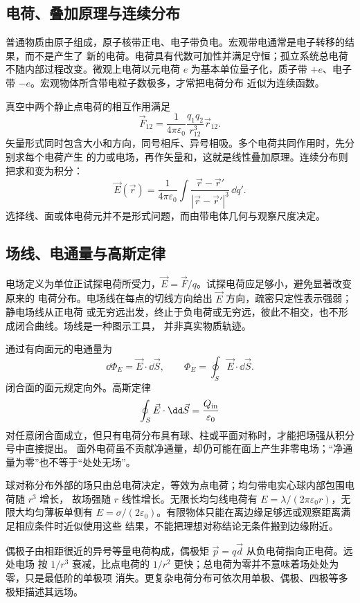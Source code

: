 \subsection*{电荷、叠加原理与连续分布}

普通物质由原子组成，原子核带正电、电子带负电。宏观带电通常是电子转移的结果，而不是产生了
新的电荷。电荷具有代数可加性并满足守恒；孤立系统总电荷不随内部过程改变。微观上电荷以元电荷
$e$ 为基本单位量子化，质子带 $+e$、电子带 $-e$。宏观物体所含带电粒子数极多，才常把电荷分布
近似为连续函数。

真空中两个静止点电荷的相互作用满足
\[
 \vec F_{12}=\frac1{4\pi\varepsilon_0}
 \frac{q_1q_2}{r_{12}^3}\vec r_{12}.
\]
矢量形式同时包含大小和方向，同号相斥、异号相吸。多个电荷共同作用时，先分别求每个电荷产生
的力或电场，再作矢量和，这就是线性叠加原理。连续分布则把求和变为积分：
\[
 \vec E(\vec r)=\frac1{4\pi\varepsilon_0}
 \int\frac{\vec r-\vec r'}{|\vec r-\vec r'|^3}\,\dd q'.
\]
选择线、面或体电荷元并不是形式问题，而由带电体几何与观察尺度决定。

\subsection*{场线、电通量与高斯定律}

电场定义为单位正试探电荷所受力，$\vec E=\vec F/q$。试探电荷应足够小，避免显著改变原来的
电荷分布。电场线在每点的切线方向给出 $\vec E$ 方向，疏密只定性表示强弱；静电场线从正电荷
或无穷远出发，终止于负电荷或无穷远，彼此不相交，也不形成闭合曲线。场线是一种图示工具，
并非真实物质轨迹。

通过有向面元的电通量为
\[
 \dd\Phi_E=\vec E\cdot\dd\vec S,
 \qquad
 \Phi_E=\oint_S\vec E\cdot\dd\vec S.
\]
闭合面的面元规定向外。高斯定律
\[
 \oint_S\vec E\cdot\dd\vec S=\frac{Q_{\rm in}}{\varepsilon_0}
\]
对任意闭合面成立，但只有电荷分布具有球、柱或平面对称时，才能把场强从积分号中直接提出。
面外电荷虽不贡献净通量，却仍可能在面上产生非零电场；“净通量为零”也不等于“处处无场”。

球对称分布外部的场只由总电荷决定，等效为点电荷；均匀带电实心球内部包围电荷随 $r^3$ 增长，
故场强随 $r$ 线性增长。无限长均匀线电荷有
$E=\lambda/(2\pi\varepsilon_0r)$，无限大均匀薄板单侧有
$E=\sigma/(2\varepsilon_0)$。有限物体只能在离边缘足够远或观察距离满足相应条件时近似使用这些
结果，不能把理想对称结论无条件搬到边缘附近。

偶极子由相距很近的异号等量电荷构成，偶极矩 $\vec p=q\vec d$ 从负电荷指向正电荷。远处电场
按 $1/r^3$ 衰减，比点电荷的 $1/r^2$ 更快；总电荷为零并不意味着场处处为零，只是最低阶的单极项
消失。更复杂电荷分布可依次用单极、偶极、四极等多极矩描述其远场。

